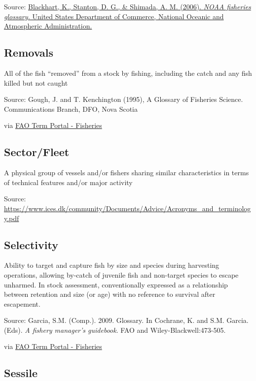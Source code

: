 \documentclass[
  11pt,
]{book}
\begin{document}
Source: \href{https://repository.library.noaa.gov/view/noaa/12856}{Blackhart, K., Stanton, D. G., \& Shimada, A. M. (2006). \emph{NOAA fisheries glossary.} United States Department of Commerce, National Oceanic and Atmospheric Administration.}

\hypertarget{removals}{%
\subsection{Removals}\label{removals}}

All of the fish ``removed'' from a stock by fishing, including the catch and any fish killed but not caught

Source: Gough, J. and T. Kenchington (1995), A Glossary of Fisheries Science. Communications Branch, DFO, Nova Scotia

via \href{http://www.fao.org/fishery/glossary/en}{FAO Term Portal - Fisheries}

\hypertarget{sectorfleet}{%
\subsection{Sector/Fleet}\label{sectorfleet}}

A physical group of vessels and/or fishers sharing similar characteristics in terms of technical features and/or major activity

Source: \url{https://www.ices.dk/community/Documents/Advice/Acronyms_and_terminology.pdf}

\hypertarget{selectivity}{%
\subsection{Selectivity}\label{selectivity}}

Ability to target and capture fish by size and species during harvesting operations, allowing by-catch of juvenile fish and non-target species to escape unharmed. In stock assessment, conventionally expressed as a relationship between retention and size (or age) with no reference to survival after escapement.

Source: Garcia, S.M. (Comp.). 2009. Glossary. In Cochrane, K. and S.M. Garcia. (Eds). \emph{A fishery manager's guidebook}. FAO and Wiley-Blackwell:473-505.

via \href{http://www.fao.org/fishery/glossary/en}{FAO Term Portal - Fisheries}

\hypertarget{sessile}{%
\subsection{Sessile}\label{sessile}}
\end{document}
